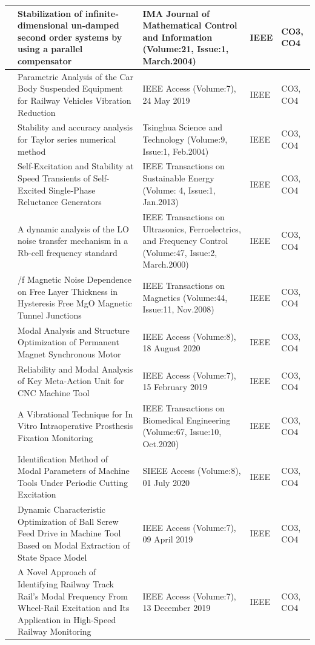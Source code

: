 \documentclass[11pt,paper=a4,answers]{exam}
\begin{document}
\begin{flushleft}
\begin{longtable}{|>{\centering\arraybackslash}p{1.4cm}  |  >{\raggedright\arraybackslash}p{6cm} |>{\centering\arraybackslash}p{3.75cm}|>{\centering\arraybackslash}p{2cm} |>{\centering\arraybackslash}p{2cm} |}
50&Stabilization of infinite‐dimensional un-damped second order systems by using a parallel compensator&IMA Journal of Mathematical Control and Information (Volume:21, Issue:1, March.2004)&IEEE&CO3, CO4\\\hline
51&Parametric Analysis of the Car Body Suspended Equipment for Railway Vehicles Vibration Reduction&IEEE Access (Volume:7), 24 May 2019&IEEE&CO3, CO4\\\hline
52&Stability and accuracy analysis for Taylor series numerical method&Tsinghua Science and Technology (Volume:9, Issue:1, Feb.2004)&IEEE&CO3, CO4\\\hline
53&Self-Excitation and Stability at Speed Transients of Self-Excited Single-Phase Reluctance Generators&IEEE Transactions on Sustainable Energy (Volume: 4, Issue:1, Jan.2013)&IEEE&CO3, CO4\\\hline
54&A dynamic analysis of the LO noise transfer mechanism in a Rb-cell frequency standard&IEEE Transactions on Ultrasonics, Ferroelectrics, and Frequency Control (Volume:47, Issue:2, March.2000)&IEEE&CO3, CO4\\\hline
55&1/f Magnetic Noise Dependence on Free Layer Thickness in Hysteresis Free MgO Magnetic Tunnel Junctions&IEEE Transactions on Magnetics (Volume:44, Issue:11, Nov.2008)&IEEE&CO3, CO4\\\hline
56&Modal Analysis and Structure Optimization of Permanent Magnet Synchronous Motor&IEEE Access (Volume:8), 18 August 2020&IEEE&CO3, CO4\\\hline
57&Reliability and Modal Analysis of Key Meta-Action Unit for CNC Machine Tool&IEEE Access (Volume:7), 15 February 2019&IEEE&CO3, CO4\\\hline
58&A Vibrational Technique for In Vitro Intraoperative Prosthesis Fixation Monitoring&IEEE Transactions on Biomedical Engineering (Volume:67, Issue:10, Oct.2020)&IEEE&CO3, CO4\\\hline
59&Identification Method of Modal Parameters of Machine Tools Under Periodic Cutting Excitation&SIEEE Access (Volume:8), 01 July 2020&IEEE&CO3, CO4\\\hline
60&Dynamic Characteristic Optimization of Ball Screw Feed Drive in Machine Tool Based on Modal Extraction of State Space Model&IEEE Access (Volume:7), 09 April 2019&IEEE&CO3, CO4\\\hline
61&A Novel Approach of Identifying Railway Track Rail’s Modal Frequency From Wheel-Rail Excitation and Its Application in High-Speed Railway Monitoring&IEEE Access (Volume:7), 13 December 2019&IEEE&CO3, CO4\\\hline

\end{longtable}
\end{flushleft}
\end{document}
